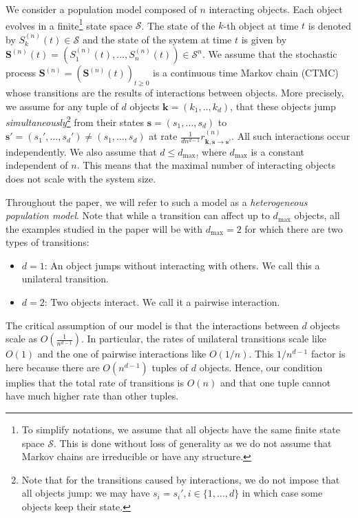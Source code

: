 \documentclass[acmsmall]{acmart}
\newcommand\bs{\mathbf{s}}
\newcommand\bk{\mathbf{k}}
\newcommand\bS{\mathbf{S}}
\newcommand\calS{\mathcal{S}}
\newcommand\toN{^{(n)}}
\newcommand\bSn{\bS\toN}
\newcommand\Sn{S\toN}
\begin{document}
We consider a population model composed of $n$ interacting objects. Each object evolves in a finite\footnote{To simplify notations, we assume that all objects have the same finite state space $\calS$. This is done without loss of generality as we do not assume that Markov chains are irreducible or have any structure.} state space $\calS$. The state of the $k$-th object at time $t$ is denoted by $S\toN_k(t)\in\calS$ and the state of the system at time $t$ is given by $\bSn(t)=(\Sn_1(t), \dots, \Sn_n(t))\in \calS^n$. We assume that the stochastic process $\bSn=(\bSn(t))_{t\ge0}$ is a continuous time Markov chain (CTMC) whose transitions are the results of interactions between objects. More precisely, we assume for any tuple of $d$ objects $\bk=(k_1,..,k_{d})$, that these objects jump \emph{simultaneously}\footnote{Note that for the transitions caused by interactions, we do not impose that all objects jump: we may have $s_i=s_i', i\in \{1,\dots,d\}$ in which case some objects keep their state.} from their states $\bs=(s_1, \dots,s_{d})$ to $\bs'=(s_1', \dots, s_{d}') \ne (s_1,\dots,s_{d})$ at rate $\frac{1}{dn^{d-1}}r_{\bk, \bs \rightarrow \bs'}\toN$. All such interactions occur independently. We also assume that $d\le d_{\max}$, where $d_{\max}$ is a constant independent of $n$. This means that the maximal number of interacting objects does not scale with the system size. 

Throughout the paper, we will refer to such a model as a \emph{heterogeneous population model}.  Note that while a transition can affect up to $d_{\max}$ objects, all the examples studied in the paper will be with $d_{\max}=2$ for which there are two types of transitions:
\begin{itemize}
  \item $d=1$: An object jumps without interacting with others. We call this a unilateral transition.
  \item $d=2$: Two objects interact. We call it a pairwise interaction. 
\end{itemize}

The critical assumption of our model is that the interactions between $d$ objects scale as $O(\frac{1}{n^{d-1}})$. In particular, the rates of unilateral transitions scale like $O(1)$ and the one of pairwise interactions like $O(1/n)$.  This $1/n^{d-1}$ factor is here because there are $O(n^{d-1})$ tuples of $d$ objects. Hence, our condition implies that the total rate of transitions is $O(n)$ and that one tuple cannot have much higher rate than other tuples.
\end{document}
